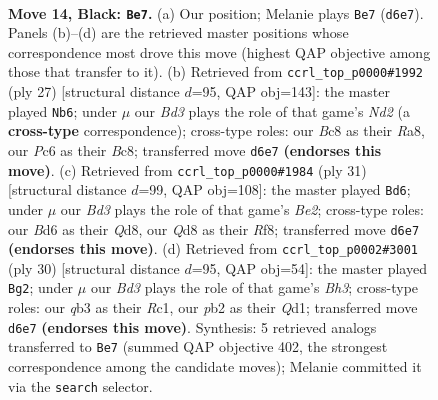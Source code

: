 \documentclass[11pt]{article}
\begin{document}
\begin{figure}[p]
\label{fig:thought-m25}
\end{figure}

\clearpage

\begin{figure}[p]\centering
\begin{subfigure}{0.46\textwidth}\centering
\resizebox{\linewidth}{!}{%
\newchessgame
\chessboard[
  setfen={1rbq1r1k/pp5p/n1pb2p1/3p1p1n/3P1P2/PQ3NP1/1P1NP1BP/R1B1R1K1 b - - 2 14},
  showmover=false,
  pgfstyle=straightmove, color=movearrow, markmove={d6-e7}
]}
\caption{}
\end{subfigure}\hfill
\begin{subfigure}{0.46\textwidth}\centering
\resizebox{\linewidth}{!}{%
\newchessgame
\chessboard[
  setfen={r1bq1r1k/1p1nb1pp/p1n1p3/3pPp2/1P1P4/P2B1N2/3N1PPP/R1BQ2RK b - - 3 14},
  showmover=false,
  pgfstyle=straightmove, color=movearrow, markmove={d7-b6}
]}
\caption{}
\end{subfigure}
\\[4pt]
\begin{subfigure}{0.46\textwidth}\centering
\resizebox{\linewidth}{!}{%
\newchessgame
\chessboard[
  setfen={2rq1rk1/1bp1bpp1/pp2pn1p/8/1PQP4/P1N1PN2/4BPPP/1RR3K1 b - - 3 16},
  showmover=false,
  pgfstyle=straightmove, color=movearrow, markmove={e7-d6}
]}
\caption{}
\end{subfigure}\hfill
\begin{subfigure}{0.46\textwidth}\centering
\resizebox{\linewidth}{!}{%
\newchessgame
\chessboard[
  setfen={3qr1k1/pbrnbpp1/1p3n1p/2ppN3/3P4/1P2P1PB/PB1N1P1P/2RQR1K1 w - - 1 16},
  showmover=false,
  pgfstyle=straightmove, color=movearrow, markmove={h3-g2}
]}
\caption{}
\end{subfigure}
\caption{\textbf{Move 14, Black: \texttt{Be7}.} (a) Our position; Melanie plays \texttt{Be7} (\texttt{d6e7}). Panels (b)--(d) are the retrieved master positions whose correspondence most drove this move (highest QAP objective among those that transfer to it). (b) Retrieved from \texttt{ccrl\_top\_p0000\#1992} (ply 27) [structural distance $d$=95, QAP obj=143]: the master played \texttt{Nb6}; under $\mu$ our \emph{Bd3} plays the role of that game's \emph{Nd2} (a \textbf{cross-type} correspondence); cross-type roles: our \emph{B}c8 as their \emph{R}a8, our \emph{P}c6 as their \emph{B}c8; transferred move \texttt{d6e7} \textbf{(endorses this move)}. (c) Retrieved from \texttt{ccrl\_top\_p0000\#1984} (ply 31) [structural distance $d$=99, QAP obj=108]: the master played \texttt{Bd6}; under $\mu$ our \emph{Bd3} plays the role of that game's \emph{Be2}; cross-type roles: our \emph{B}d6 as their \emph{Q}d8, our \emph{Q}d8 as their \emph{R}f8; transferred move \texttt{d6e7} \textbf{(endorses this move)}. (d) Retrieved from \texttt{ccrl\_top\_p0002\#3001} (ply 30) [structural distance $d$=95, QAP obj=54]: the master played \texttt{Bg2}; under $\mu$ our \emph{Bd3} plays the role of that game's \emph{Bh3}; cross-type roles: our \emph{q}b3 as their \emph{R}c1, our \emph{p}b2 as their \emph{Q}d1; transferred move \texttt{d6e7} \textbf{(endorses this move)}. Synthesis: 5 retrieved analogs transferred to \texttt{Be7} (summed QAP objective 402, the strongest correspondence among the candidate moves); Melanie committed it via the \texttt{search} selector.}

\end{figure}
\end{document}
